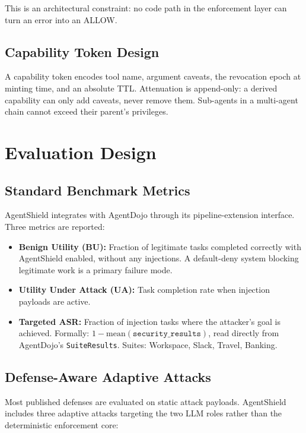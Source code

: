 \documentclass[10pt,conference]{IEEEtran}
\begin{document}
This is an architectural constraint: no code path in the enforcement layer can
turn an error into an ALLOW.

\subsection{Capability Token Design}

A capability token encodes tool name, argument caveats, the revocation epoch
at minting time, and an absolute TTL. Attenuation is append-only: a derived
capability can only add caveats, never remove them. Sub-agents in a
multi-agent chain cannot exceed their parent's privileges.

\section{Evaluation Design}

\subsection{Standard Benchmark Metrics}

AgentShield integrates with AgentDojo \cite{agentdojo2024} through its
pipeline-extension interface. Three metrics are reported:

\begin{itemize}
  \item \textbf{Benign Utility (BU):} Fraction of legitimate tasks completed
    correctly with AgentShield enabled, without any injections. A default-deny
    system blocking legitimate work is a primary failure mode.
  \item \textbf{Utility Under Attack (UA):} Task completion rate when
    injection payloads are active.
  \item \textbf{Targeted ASR:} Fraction of injection tasks where the attacker's
    goal is achieved. Formally: $1 - \mathrm{mean}(\texttt{security\_results})$,
    read directly from AgentDojo's \texttt{SuiteResults}. Suites: Workspace,
    Slack, Travel, Banking.
\end{itemize}

\subsection{Defense-Aware Adaptive Attacks}

Most published defenses are evaluated on static attack payloads. AgentShield
includes three adaptive attacks targeting the two LLM roles rather than the
deterministic enforcement core:
\end{document}
